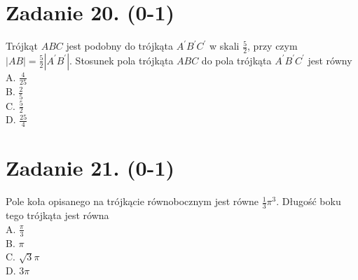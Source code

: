 \documentclass[10pt]{article}
\begin{document}
\section*{Zadanie 20. (0-1)}
Trójkąt \(A B C\) jest podobny do trójkąta \(A^{\prime} B^{\prime} C^{\prime}\) w skali \(\frac{5}{2}\), przy czym \(|A B|=\frac{5}{2}\left|A^{\prime} B^{\prime}\right|\). Stosunek pola trójkąta \(A B C\) do pola trójkąta \(A^{\prime} B^{\prime} C^{\prime}\) jest równy\\
A. \(\frac{4}{25}\)\\
B. \(\frac{2}{5}\)\\
C. \(\frac{5}{2}\)\\
D. \(\frac{25}{4}\)

\section*{Zadanie 21. (0-1)}
Pole koła opisanego na trójkącie równobocznym jest równe \(\frac{1}{3} \pi^{3}\). Długość boku tego trójkąta jest równa\\
A. \(\frac{\pi}{3}\)\\
B. \(\pi\)\\
C. \(\sqrt{3} \pi\)\\
D. \(3 \pi\)
\end{document}
